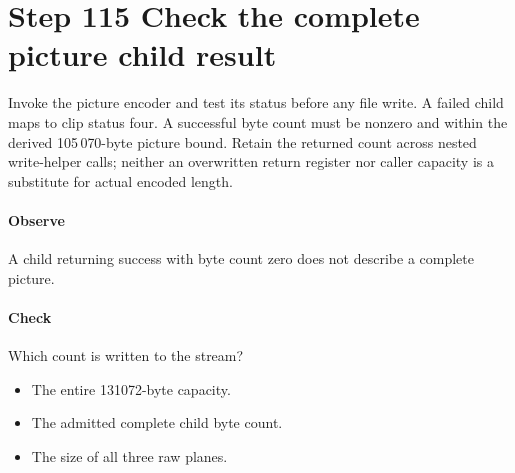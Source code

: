 \section{Step 115 Check the complete picture child result}\label{h263-clip-s05}
Invoke the picture encoder and test its status before any file write. A failed
child maps to clip status four. A successful byte count must be nonzero and within
the derived 105\,070-byte picture bound. Retain the returned count across nested
write-helper calls; neither an overwritten return register nor caller capacity
is a substitute for actual encoded length.

\paragraph{Observe} A child returning success with byte count zero does not describe a complete picture.
\paragraph{Check} Which count is written to the stream?
\begin{itemize}
  \item[A.] The entire 131072-byte capacity.
  \item[B.] The admitted complete child byte count.
  \item[C.] The size of all three raw planes.
\end{itemize}
